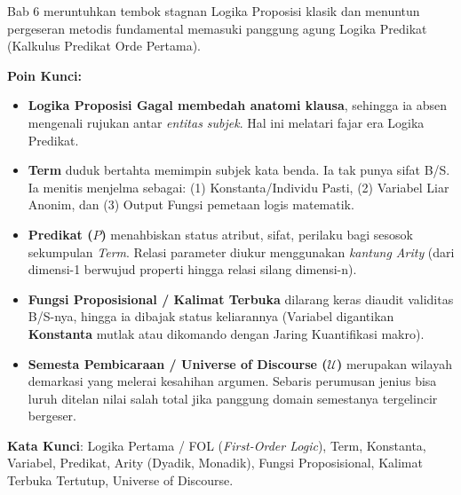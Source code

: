 \documentclass[../main]{subfiles}
\begin{document}
\begin{rangkuman}
Bab 6 meruntuhkan tembok stagnan Logika Proposisi klasik dan menuntun pergeseran metodis fundamental memasuki panggung agung Logika Predikat (Kalkulus Predikat Orde Pertama). 

\textbf{Poin Kunci:}
\begin{itemize}
  \item \textbf{Logika Proposisi Gagal membedah anatomi klausa}, sehingga ia absen mengenali rujukan antar \textit{entitas subjek}. Hal ini melatari fajar era Logika Predikat.
  \item \textbf{Term} duduk bertahta memimpin subjek kata benda. Ia tak punya sifat B/S. Ia menitis menjelma sebagai: (1) Konstanta/Individu Pasti, (2) Variabel Liar Anonim, dan (3) Output Fungsi pemetaan logis matematik.
  \item \textbf{Predikat ($P$)} menahbiskan status atribut, sifat, perilaku bagi sesosok sekumpulan \textit{Term}. Relasi parameter diukur menggunakan \textit{kantung Arity} (dari dimensi-1 berwujud properti hingga relasi silang dimensi-n).
  \item \textbf{Fungsi Proposisional / Kalimat Terbuka} dilarang keras diaudit validitas B/S-nya, hingga ia dibajak status keliarannya (Variabel digantikan \textbf{Konstanta} mutlak atau dikomando dengan Jaring Kuantifikasi makro).
  \item \textbf{Semesta Pembicaraan / Universe of Discourse ($\mathcal{U}$)} merupakan wilayah demarkasi yang melerai kesahihan argumen. Sebaris perumusan jenius bisa luruh ditelan nilai salah total jika panggung domain semestanya tergelincir bergeser.
\end{itemize}

\textbf{Kata Kunci}: Logika Pertama / FOL (\textit{First-Order Logic}), Term, Konstanta, Variabel, Predikat, Arity (Dyadik, Monadik), Fungsi Proposisional, Kalimat Terbuka Tertutup, Universe of Discourse.
\end{rangkuman}

\ifSubfilesClassLoaded{
  \renewcommand{\bibname}{Daftar Pustaka}
  
  
}{}
\end{document}
